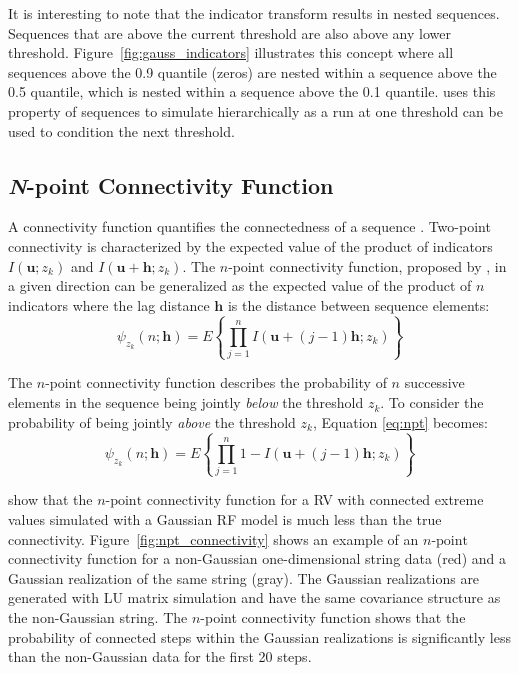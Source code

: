 It is interesting to note that the indicator transform results in nested sequences. Sequences that are above the current threshold are also above any lower threshold. Figure~\ref{fig:gauss_indicators} illustrates this concept where all sequences above the 0.9 quantile (zeros) are nested within a sequence above the 0.5 quantile, which is nested within a sequence above the 0.1 quantile. \cite{ortiz2003characterization} uses this property of sequences to simulate hierarchically as a run at one threshold can be used to condition the next threshold.

\subsection{\textit{N}-point Connectivity Function}
\label{subsec:03npoint}

A connectivity function quantifies the connectedness of a sequence \citep{renard2011conditioning}. Two-point connectivity is characterized by the expected value of the product of indicators $I(\mathbf{u}; z_{k})$ and $I(\mathbf{u}+\mathbf{h}; z_{k})$. The $n\text{-point}$ connectivity function, proposed by \cite{journel1989nongaussian}, in a given direction can be generalized as the expected value of the product of $n$ indicators where the lag distance $\mathbf{h}$ is the distance between sequence elements:
\begin{equation}
    \psi_{z_{k}}(n;\mathbf{h}) = E\left\{\prod_{j=1}^{n} I(\mathbf{u} + (j-1)\mathbf{h}; z_{k})\right\}
    \label{eq:npt}
\end{equation}

The $n\text{-point}$ connectivity function describes the probability of $n$ successive elements in the sequence being jointly \emph{below} the threshold $z_{k}$. To consider the probability of being jointly \emph{above} the threshold $z_{k}$, Equation \ref{eq:npt} becomes:
\begin{equation}
    \psi_{z_{k}}(n;\mathbf{h}) = E\left\{\prod_{j=1}^{n} 1 - I(\mathbf{u} + (j-1)\mathbf{h}; z_{k})\right\}
    \label{eq:npt2}
\end{equation}

\cite{journel1989nongaussian} show that the $n\text{-point}$ connectivity function for a \gls{RV} with connected extreme values simulated with a Gaussian \gls{RF} model is much less than the true connectivity. Figure~\ref{fig:npt_connectivity} shows an example of an $n\text{-point}$ connectivity function for a non-Gaussian one-dimensional string data (red) and a Gaussian realization of the same string (gray). The Gaussian realizations are generated with LU matrix simulation \citep{davis1987production} and have the same covariance structure as the non-Gaussian string. The $n$-point connectivity function shows that the probability of connected steps within the Gaussian realizations is significantly less than the non-Gaussian data for the first 20 steps.

